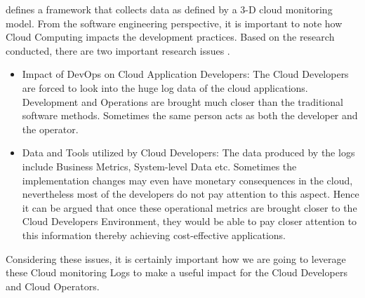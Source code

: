 \documentclass[article,type=msc,colorback,12pt,accentcolor=tud7b,table]{tudthesis}
\begin{document}
\cite{bruneo2015framework} defines a framework that collects data as defined by a 3-D cloud monitoring model. From the software engineering perspective, it is important to note how Cloud Computing impacts the development practices. Based on the research conducted, there are two important research issues \cite{cito2014making}. 

\begin{itemize}

	
	\item Impact of DevOps on Cloud Application Developers:	
	The Cloud Developers are forced to look into the huge log data of the cloud applications. Development and Operations are brought much closer than the traditional software methods. Sometimes the same person acts as both the developer and the operator. 
	
	\item Data and Tools utilized by Cloud Developers:
	The data produced by the logs include Business Metrics, System-level Data etc. Sometimes the implementation changes may even have monetary consequences in the cloud, nevertheless most of the developers do not pay attention to this aspect. Hence it can be argued that once these operational metrics are brought closer to the Cloud Developers Environment, they would be able to pay closer attention to this information thereby achieving cost-effective applications.
	
\end{itemize}

Considering these issues, it is certainly important how we are going to leverage these Cloud monitoring Logs to make a useful impact for the Cloud Developers and Cloud Operators. 
 
\end{document}
